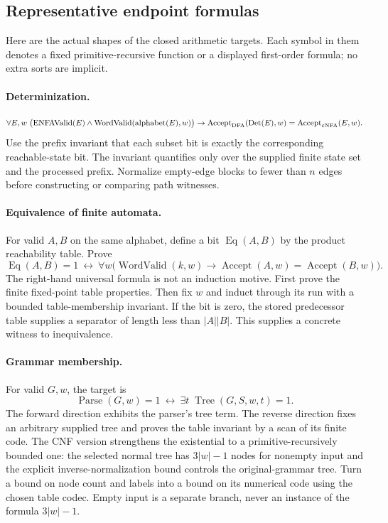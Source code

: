 \subsection{Representative endpoint formulas}

Here are the actual shapes of the closed arithmetic targets. Each symbol
in them denotes a fixed primitive-recursive function or a displayed
first-order formula; no extra sorts are implicit.

\paragraph{Determinization.}
\[
 \forall E,w\;\bigl(\operatorname{ENFAValid}(E)\land
 \operatorname{WordValid}(\operatorname{alphabet}(E),w)\bigr)
 \to \operatorname{Accept}_{\rm DFA}(\operatorname{Det}(E),w)
      =\operatorname{Accept}_{\varepsilon\rm NFA}(E,w).
\]
Use the prefix invariant that each subset bit is exactly the corresponding
reachable-state bit. The invariant quantifies only over the supplied finite
state set and the processed prefix. Normalize empty-edge blocks to fewer
than $n$ edges before constructing or comparing path witnesses.

\paragraph{Equivalence of finite automata.}
For valid $A,B$ on the same alphabet, define a bit $\operatorname{Eq}(A,B)$
by the product reachability table. Prove
\[
 \operatorname{Eq}(A,B)=1\ \longleftrightarrow\
 \forall w\bigl(\operatorname{WordValid}(k,w)\to
                  \operatorname{Accept}(A,w)=\operatorname{Accept}(B,w)\bigr).
\]
The right-hand universal formula is not an induction motive. First prove
the finite fixed-point table properties. Then fix $w$ and induct through
its run with a bounded table-membership invariant. If the bit is zero,
the stored predecessor table supplies a separator of length less than
$|A||B|$. This supplies a concrete witness to inequivalence.

\paragraph{Grammar membership.}
For valid $G,w$, the target is
\[
 \operatorname{Parse}(G,w)=1\ \longleftrightarrow\
 \exists t\;\operatorname{Tree}(G,S,w,t)=1.
\]
The forward direction exhibits the parser's tree term. The reverse direction
fixes an arbitrary supplied tree and proves the table invariant by a scan
of its finite code. The CNF version strengthens the existential to a
primitive-recursively bounded one: the selected normal tree has $3|w|-1$
nodes for nonempty input and the explicit inverse-normalization bound
controls the original-grammar tree. Turn a bound on node count and labels
into a bound on its numerical code using the chosen table codec. Empty
input is a separate branch, never an instance of the formula $3|w|-1$.

